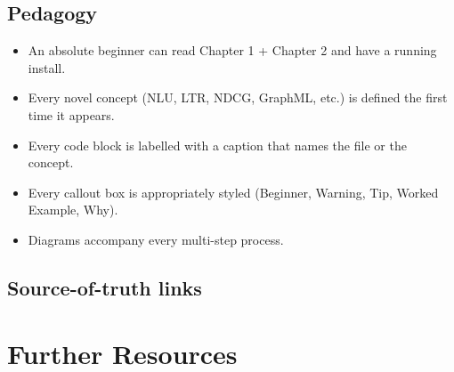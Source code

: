 \documentclass[11pt,a4paper,oneside]{book}
\DeclareRobustCommand{\fileref}[1]{\texorpdfstring{\colorbox{filerefbg}{\strut\ttfamily\small\detokenize{#1}}}{#1}}
\begin{document}
\section{Pedagogy}

\begin{itemize}
  \item[$\square$] An absolute beginner can read Chapter 1 + Chapter 2
        and have a running install.
  \item[$\square$] Every novel concept (NLU, LTR, NDCG, GraphML, etc.)
        is defined the first time it appears.
  \item[$\square$] Every code block is labelled with a caption that
        names the file or the concept.
  \item[$\square$] Every callout box is appropriately styled (Beginner,
        Warning, Tip, Worked Example, Why).
  \item[$\square$] Diagrams accompany every multi-step process.
\end{itemize}

\section{Source-of-truth links}


\chapter{Further Resources}
\label{app:resources}
\end{document}
